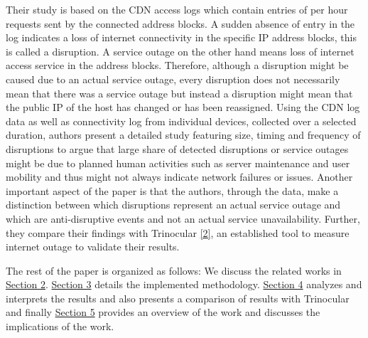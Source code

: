 \documentclass[11pt,twoside,a4paper]{article}
\begin{document}
Their study is based on the CDN access logs which contain entries of per hour requests sent by the connected address blocks. A sudden absence of entry in the log indicates a loss of internet connectivity in the specific IP address blocks, this is called a disruption. A service outage on the other hand means loss of internet access service in the address blocks. Therefore, although a disruption might be caused due to an actual service outage, every disruption does not necessarily mean that there was a service outage but instead a disruption might mean that the public IP of the host has changed or has been reassigned. Using the CDN log data as well as connectivity log from individual devices, collected over a selected duration, authors present a detailed study featuring size, timing and frequency of disruptions to argue that large share of detected disruptions or service outages might be due to planned human activities such as server maintenance and user mobility and thus might not always indicate network failures or issues. Another important aspect of the paper is that the authors, through the data, make a distinction between which disruptions represent an actual service outage and which are anti-disruptive events and not an actual service unavailability. Further, they compare their findings with Trinocular \hyperlink {K2}{[2]}, an established tool to measure internet outage to validate their results.

The rest of the paper is organized as follows: We discuss the related works in \hyperref[RW]{Section 2}. \hyperref[M]{Section 3} details the implemented methodology. \hyperref[RandEv]{Section 4} analyzes and interprets the results and also presents a comparison of results with Trinocular and finally \hyperref[DC]{Section 5} provides an overview of the work and discusses the implications of the work.

\end{document}
